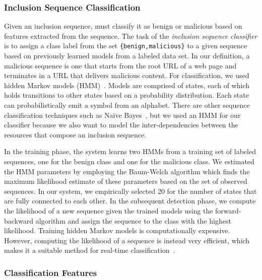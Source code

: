 \subsubsection{Inclusion Sequence Classification}
\label{inclusion:sec:classification}

Given an inclusion sequence, \excision must classify it as benign or malicious
based on features extracted from the sequence. The task of the \emph{inclusion
sequence classifier} is to assign a class label from the set
\texttt{\{benign,malicious\}} to a given sequence based on previously learned
models from a labeled data set. In our definition, a malicious sequence is one
that starts from the root URL of a web page and terminates in a URL that
delivers malicious content. For classification, we used hidden Markov models
(HMM)~\cite{ieee1989hmm}. Models are comprised of states, each of which holds
transitions to other states based on a probability distribution. Each state can
probabilistically emit a symbol from an alphabet. There are other sequence
classification techniques such as Na\"{i}ve Bayes~\cite{ecml1998naivebayes}, but
we used an HMM for our classifier because we also want to model the
inter-dependencies between the resources that compose an inclusion sequence.

In the training phase, the system learns two HMMs from a training set of labeled
sequences, one for the benign class and one for the malicious class. We
estimated the HMM parameters by employing the Baum-Welch algorithm which finds
the maximum likelihood estimate of these parameters based on the set of observed
sequences. In our system, we empirically selected 20 for the number of states
that are fully connected to each other. In the subsequent detection phase, we
compute the likelihood of a new sequence given the trained models using the
forward-backward algorithm and assign the sequence to the class with the highest
likelihood. Training hidden Markov models is computationally expensive. However,
computing the likelihood of a sequence is instead very efficient, which makes it
a suitable method for real-time classification~\cite{ieee1989hmm}.

\subsubsection{Classification Features}
\label{inclusion:sec:features}

